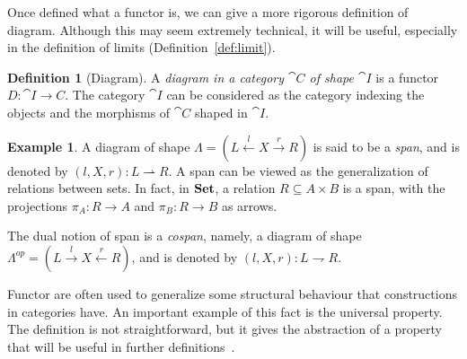 \documentclass[a4paper, twoside,openright]{report}
\theoremstyle{plain}
\theoremstyle{definition}
\newtheorem{definition}[theorem]{Definition}
\newtheorem{example}[theorem]{Example}
\begin{document}
Once defined what a functor is, we can give a more rigorous definition of diagram. Although this may seem extremely technical, it will be useful, especially in the definition of limits (Definition~\ref{def:limit}).

\begin{definition}[Diagram]\label{def:diagram}
    A \emph{diagram in a category $\cat C$ of shape $\cat I$} is a functor $D: \cat{I \rightarrow C}$.
    The category $\cat I$ can be considered as the category indexing the objects and the morphisms of $\cat C$ shaped in $\cat I$.
\end{definition}

\begin{example}\label{ex: span}
    A diagram of shape $\Lambda = (L \xleftarrow{l} X \xrightarrow{r} R)$ is said to be a \emph{span}, and is denoted by $(l, X, r): L \rightharpoonup R$.
    A span can be viewed as the generalization of relations between sets. In fact, in $\mathbf{Set}$, a relation $R \subseteq A \times B$ is a span, with the projections $\pi_A : R \rightarrow A$ and $\pi_B : R \rightarrow B$ as arrows.
    
    The dual notion of span is a \emph{cospan}, namely, a diagram of shape $\Lambda^{op} = (L \xrightarrow{l} X \xleftarrow{r} R)$, and is denoted by $(l, X, r): L \rightharpoondown R$.
\end{example}

Functor are often used to generalize some structural behaviour that constructions in categories have. An important example of this fact is the universal property. The definition is not straightforward, but it gives the abstraction of a property that will be useful in further definitions~\cite{Herrlich_Strecker_1979}.
\end{document}

